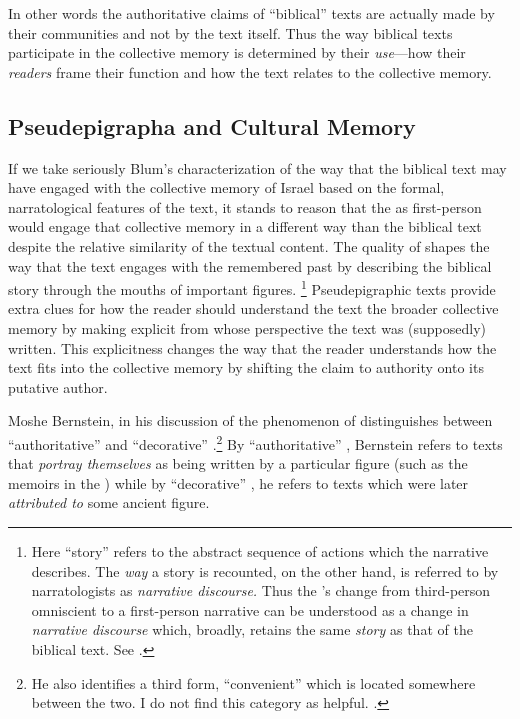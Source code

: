 In other words the authoritative claims of ``biblical'' texts are actually made by their communities and not by the text itself. Thus the way biblical texts participate in the collective memory is determined by their \emph{use}---how their \emph{readers} frame their function and how the text relates to the collective memory. 

\subsection{Pseudepigrapha and Cultural Memory}

If we take seriously Blum's characterization of the way that the biblical text may have engaged with the collective memory of Israel based on the formal, narratological features of the text, it stands to reason that the \ga as first-person \psy would engage that collective memory in a different way than the biblical text despite the relative similarity of the textual content. The \psgraphic quality of \ga shapes the way that the text engages with the remembered past by describing the biblical story through the mouths of important figures.%
%
\footnote{Here ``story'' refers to the abstract sequence of actions which the narrative describes. The \emph{way} a story is recounted, on the other hand, is referred to by narratologists as \emph{narrative discourse.} Thus the \ga's change from third-person omniscient to a \psgraphical first-person narrative can be understood as a change in \emph{narrative discourse} which, broadly, retains the same \emph{story} as that of the biblical text. See \cite[TODO: PAGE NUMBER]{abbott2008}.}
%
Pseudepigraphic texts provide extra clues for how the reader should understand the text \visavis the broader collective memory by making explicit from whose perspective the text was (supposedly) written. This explicitness changes the way that the reader understands how the text fits into the collective memory by shifting the claim to authority onto its putative author. 

Moshe Bernstein, in his discussion of the phenomenon of \psy distinguishes between ``authoritative'' \psy and ``decorative'' \psy.\footnote{He also identifies a third form, ``convenient'' \psy which is located somewhere between the two. I do not find this category as helpful. \autocite[3--7]{bernstein_chazon-etal1999}.} By ``authoritative'' \psy, Bernstein refers to texts that \emph{portray themselves} as being written by a particular figure (such as the memoirs in the \ga) while by ``decorative'' \psy, he refers to texts which were later \emph{attributed to} some ancient figure.

